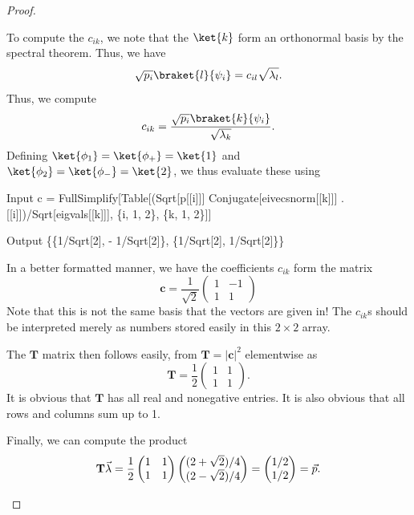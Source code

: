 \begin{proof}
\begin{parts}
		To compute the $c_{ik}$, we note that the $\ket{k}$ form an orthonormal basis by the spectral theorem. Thus, we have
		\[
			\sqrt{p_i}\braket{l}{\psi_i} = c_{il}\sqrt{\lambda_l} 
		.\] 
		Thus, we compute
		\[
			c_{ik} = \frac{\sqrt{p_i} \braket{k}{\psi_i}}{\sqrt{\lambda_k} }
		.\] 
		Defining $\ket{\phi_1} = \ket{\phi_+} = \ket{1}$ and $\ket{\phi_2}=\ket{\phi_-}=\ket{2}$, we thus evaluate these using
		\begin{mmaCell}{Input}
c = FullSimplify[Table[(Sqrt[p[[i]]] Conjugate[eivecsnorm[[k]]] . \mmaUnd{\(\psi\)}[[i]])/Sqrt[eigvals[[k]]], \{i, 1, 2\}, \{k, 1, 2\}]]
		\end{mmaCell}
		\begin{mmaCell}{Output}
\{\{1/Sqrt[2], - 1/Sqrt[2]\}, \{1/Sqrt[2], 1/Sqrt[2]\}\}
		\end{mmaCell}
		In a better formatted manner, we have the coefficients $c_{ik}$ form the matrix
		\[\mathbf{c} = \frac1{\sqrt{2}}\begin{pmatrix}
			1 & -1 \\ 1 & 1
		\end{pmatrix}\]
		Note that this is not the same basis that the vectors are given in! The $c_{ik}$s should be interpreted merely as numbers stored easily in this $2\times 2$ array. 
		
The $\mathbf{T}$ matrix then follows easily, from $\mathbf{T} = |\mathbf{c}|^2$ elementwise as
\[
	\mathbf T = \frac{1}{2}\begin{pmatrix} 1 & 1 \\ 1 & 1 \end{pmatrix} 
.\] 
It is obvious that $\mathbf T$ has all real and nonegative entries. It is also obvious that all rows and columns sum up to 1. 

Finally, we can compute the product
\[
	\mathbf T\vec{\lambda} = \frac{1}{2}\begin{pmatrix}1 & 1 \\ 1 & 1  \end{pmatrix} \begin{pmatrix} (2+\sqrt{2}) / 4 \\ (2 - \sqrt{2} ) / 4   \end{pmatrix} = \begin{pmatrix} 1 / 2 \\ 1 / 2 \end{pmatrix} =\vec{p} 
.\qedhere\] 
	\end{parts}
\end{proof}
